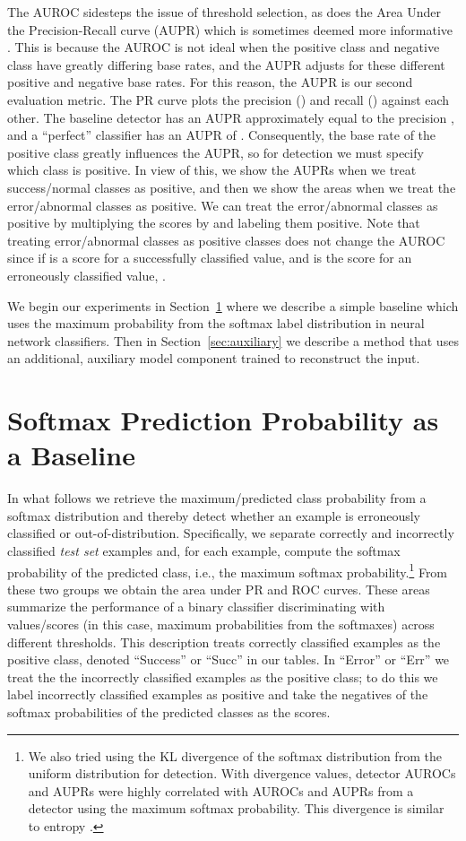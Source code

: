 \documentclass{article}
\begin{document}
The AUROC sidesteps the issue of threshold selection, as does the Area Under the Precision-Recall curve (AUPR) which is sometimes deemed more informative \citep{manning}. This is because the AUROC is not ideal when the positive class and negative class have greatly differing base rates, and the AUPR adjusts for these different positive and negative base rates. For this reason, the AUPR is our second evaluation metric. The PR curve plots the precision () and recall () against each other. The baseline detector has an AUPR approximately equal to the precision \citep{auprbaseline}, and a ``perfect'' classifier has an AUPR of . Consequently, the base rate of the positive class greatly influences the AUPR, so for detection we must specify which class is positive. In view of this, we show the AUPRs when we treat success/normal classes as positive, and then we show the areas when we treat the error/abnormal classes as positive. We can treat the error/abnormal classes as positive by multiplying the scores by  and labeling them positive. Note that treating error/abnormal classes as positive classes does not change the AUROC since if  is a score for a  successfully classified value, and  is the score for an erroneously classified value, .


We begin our experiments in Section~\ref{sec:softmax-stats} where we describe a simple baseline which uses the maximum probability from the softmax label distribution in neural network classifiers. Then in Section~\ref{sec:auxiliary} we describe a method that uses an additional, auxiliary model component trained to reconstruct the input.

\section{Softmax Prediction Probability as a Baseline}
\label{sec:softmax-stats}
In what follows we retrieve the maximum/predicted class probability from a softmax distribution and thereby detect whether an example is erroneously classified or out-of-distribution. Specifically, we separate correctly and incorrectly classified \emph{test set} examples and, for each example, compute the softmax probability of the predicted class, i.e., the maximum softmax probability.\footnote{We also tried using the KL divergence of the softmax distribution from the uniform distribution for detection. With divergence values, detector AUROCs and AUPRs were highly correlated with AUROCs and AUPRs from a detector using the maximum softmax probability. This divergence is similar to entropy \citep{jacob, williams}.} From these two groups we obtain the area under PR and ROC curves. These areas summarize the performance of a binary classifier discriminating with values/scores (in this case, maximum probabilities from the softmaxes) across different thresholds. This description treats correctly classified examples as the positive class, denoted ``Success'' or ``Succ'' in our tables. In ``Error'' or ``Err'' we treat the the incorrectly classified examples as the positive class; to do this we label incorrectly classified examples as positive and take the negatives of the softmax probabilities of the predicted classes as the scores.
\end{document}
